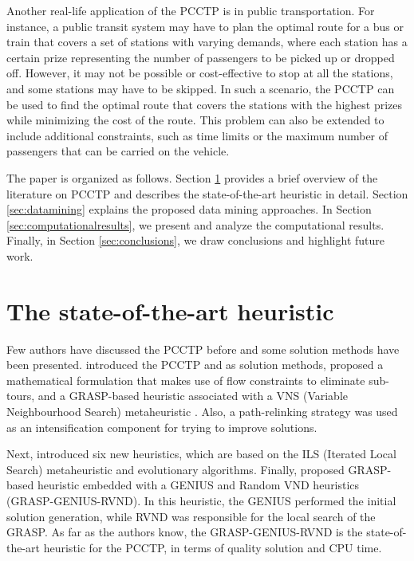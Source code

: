 \documentclass{singlecol-new}
\begin{document}
Another real-life application of the PCCTP is in public transportation. For instance, a public transit system may have to plan the optimal route for a bus or train that covers a set of stations with varying demands, where each station has a certain prize representing the number of passengers to be picked up or dropped off. However, it may not be possible or cost-effective to stop at all the stations, and some stations may have to be skipped. In such a scenario, the PCCTP can be used to find the optimal route that covers the stations with the highest prizes while minimizing the cost of the route. This problem can also be extended to include additional constraints, such as time limits or the maximum number of passengers that can be carried on the vehicle.

The paper is organized as follows. Section \ref{sec:grasp} provides a brief overview of the literature on PCCTP and describes the state-of-the-art heuristic in detail. Section \ref{sec:datamining} explains the proposed data mining approaches. In Section \ref{sec:computationalresults}, we present and analyze the computational results. Finally, in Section \ref{sec:conclusions}, we draw conclusions and highlight future work.

\section{The state-of-the-art heuristic}

\label{sec:grasp}

Few authors have discussed the PCCTP before and some solution methods have been presented. \citep{lyra2004problema} introduced the PCCTP and as solution methods, proposed a mathematical formulation that makes use of flow constraints to eliminate sub-tours, and a GRASP-based heuristic  \citep{grasp03}   associated with a VNS (Variable Neighbourhood Search) metaheuristic \citep{mladenovic97}.  Also, a path-relinking strategy was used as an intensification component for trying to improve solutions.

Next, \citet{silva2009problema} introduced  six new heuristics,  which are based on the ILS (Iterated Local Search) metaheuristic and evolutionary algorithms. Finally, \citet{daSilva} proposed GRASP-based heuristic embedded with a GENIUS \citep{genius} and Random VND \citep{mladenovic12} heuristics (GRASP-GENIUS-RVND). In this heuristic, the GENIUS performed the initial solution generation, while RVND was responsible for the local search of the GRASP. As far as the authors know, the GRASP-GENIUS-RVND is the state-of-the-art heuristic for the PCCTP, in terms of quality solution and CPU time.
\end{document}
